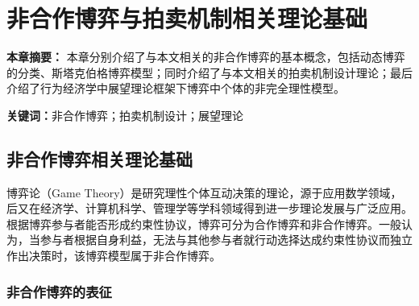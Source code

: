 \chapter{非合作博弈与拍卖机制相关理论基础}

\textbf{本章摘要：} 
本章分别介绍了与本文相关的非合作博弈的基本概念，包括动态博弈的分类、斯塔克伯格博弈模型；同时介绍了与本文相关的拍卖机制设计理论；最后介绍了行为经济学中展望理论框架下博弈中个体的非完全理性模型。


\textbf{关键词：}非合作博弈；拍卖机制设计；展望理论


\section{非合作博弈相关理论基础}\label{sec:game}
博弈论（Game Theory）是研究理性个体互动决策的理论，源于应用数学领域，后又在经济学、计算机科学、管理学等学科领域得到进一步理论发展与广泛应用。根据博弈参与者能否形成约束性协议，博弈可分为合作博弈和非合作博弈\cite{osborne,Fudenberg}。一般认为，当参与者根据自身利益，无法与其他参与者就行动选择达成约束性协议而独立作出决策时，该博弈模型属于非合作博弈\cite{osborne}。

\subsection{非合作博弈的表征}

